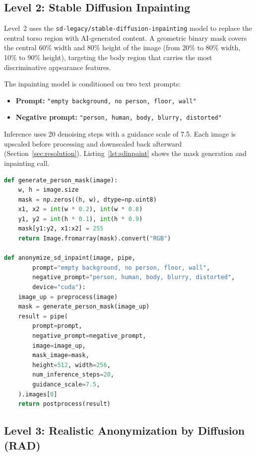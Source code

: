 \subsection{Level 2: Stable Diffusion Inpainting}

Level~2 uses the \texttt{sd-legacy/stable-diffusion-inpainting} model \cite{rombach2022ldm} to replace the central torso region with AI-generated content. A geometric binary mask covers the central 60\% width and 80\% height of the image (from 20\% to 80\% width, 10\% to 90\% height), targeting the body region that carries the most discriminative appearance features.

The inpainting model is conditioned on two text prompts:
\begin{itemize}[noitemsep]
    \item \textbf{Prompt:} \texttt{"empty background, no person, floor, wall"}
    \item \textbf{Negative prompt:} \texttt{"person, human, body, blurry, distorted"}
\end{itemize}

Inference uses 20 denoising steps with a guidance scale of 7.5. Each image is upscaled before processing and downscaled back afterward (Section~\ref{sec:resolution}). Listing~\ref{lst:sdinpaint} shows the mask generation and inpainting call.

\begin{lstlisting}[language=Python, caption={Level~2 SD Inpaint mask and anonymization (\texttt{sd\_inpaint.py}).}, label=lst:sdinpaint]
def generate_person_mask(image):
    w, h = image.size
    mask = np.zeros((h, w), dtype=np.uint8)
    x1, x2 = int(w * 0.2), int(w * 0.8)
    y1, y2 = int(h * 0.1), int(h * 0.9)
    mask[y1:y2, x1:x2] = 255
    return Image.fromarray(mask).convert("RGB")

def anonymize_sd_inpaint(image, pipe,
        prompt="empty background, no person, floor, wall",
        negative_prompt="person, human, body, blurry, distorted",
        device="cuda"):
    image_up = preprocess(image)
    mask = generate_person_mask(image_up)
    result = pipe(
        prompt=prompt,
        negative_prompt=negative_prompt,
        image=image_up,
        mask_image=mask,
        height=512, width=256,
        num_inference_steps=20,
        guidance_scale=7.5,
    ).images[0]
    return postprocess(result)
\end{lstlisting}

\subsection{Level 3: Realistic Anonymization by Diffusion (RAD)}

